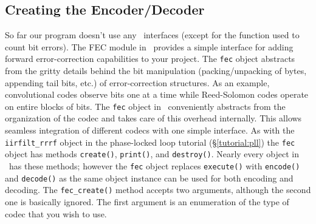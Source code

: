 \subsection{Creating the Encoder/Decoder}
\label{tutorial:fec:codec}
So far our program doesn't use any \liquid\ interfaces (except for the
function used to count bit errors).
The FEC module in \liquid\ provides a simple interface for adding
forward error-correction capabilities to your project.
The {\tt fec} object abstracts from the gritty details behind the bit
manipulation (packing/unpacking of bytes, appending tail bits, etc.)
of error-correction structures.
As an example, convolutional codes observe bits one at a time while
Reed-Solomon codes operate on entire blocks of bits.
The {\tt fec} object in \liquid\ conveniently abstracts from the
organization of the codec and takes care of this overhead internally.
This allows seamless integration of different codecs with one simple
interface.
%
As with the {\tt iirfilt\_rrrf} object in the phase-locked loop tutorial
(\S\ref{tutorial:pll})
the {\tt fec} object has methods
{\tt create()},
{\tt print()}, and
{\tt destroy()}.
Nearly every object in \liquid\ has these methods;
however the {\tt fec} object replaces {\tt execute()} with
{\tt encode()} and {\tt decode()} as the
same object instance can be used for both encoding and decoding.
The {\tt fec\_create()} method accepts two arguments, although the
second one is basically ignored.
The first argument is an enumeration of the type of codec that you wish
to use.

